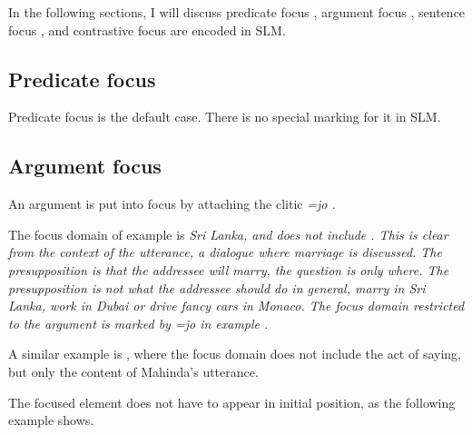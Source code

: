 In the following sections, I will discuss predicate focus , argument focus , sentence focus , and contrastive focus  are encoded in SLM.

\subsection{Predicate focus}\label{sec:disc:Predicatefocus}
Predicate focus is the default case. There is no special marking for it in SLM.

\subsection{Argument focus}\label{sec:disc:Argumentfocus}
An argument is put into focus by attaching the clitic \em=jo \em {}.


The focus domain of example  is \em Sri Lanka\em, and does not include . This is clear from the context of the utterance, a dialogue where marriage is discussed. The presupposition is that the addressee will marry, the question is only where. The presupposition is not what the addressee should do in general, marry in Sri Lanka, work in Dubai or drive fancy cars in Monaco.
The focus domain restricted to the argument is marked by \em =jo \em in example .

A similar example is , where the focus domain does not include the act of saying, but only the content of Mahinda's utterance.



The focused element does not have to appear in initial position, as the following example shows.


